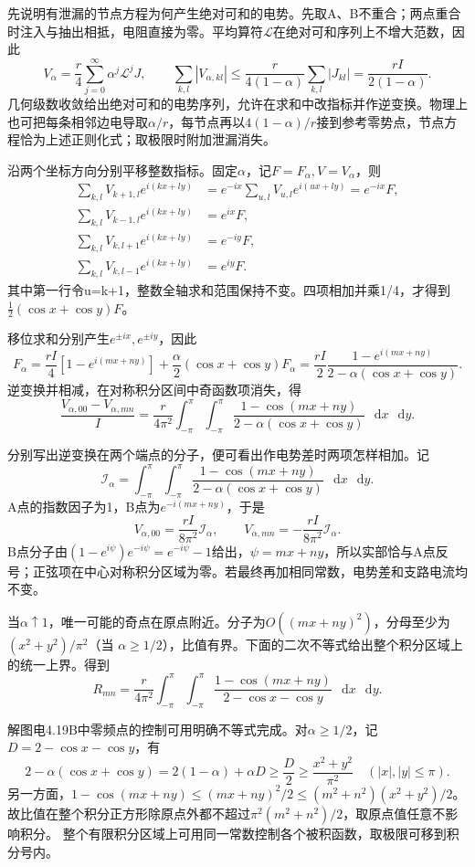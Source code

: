 \documentclass[UTF8,fontset=fandol,a4paper,11pt]{ctexart}
\newcommand{\dd}{\mathop{}\!\mathrm{d}}
\begin{document}
先说明有泄漏的节点方程为何产生绝对可和的电势。先取A、B不重合；两点重合时注入与抽出相抵，电阻直接为零。平均算符$\mathcal L$在绝对可和序列上不增大范数，因此
\[
V_\alpha=\frac r4\sum_{j=0}^{\infty}\alpha^j\mathcal L^jJ,\qquad
\sum_{k,l}|V_{\alpha,kl}|\le\frac{r}{4(1-\alpha)}\sum_{k,l}|J_{kl}|
=\frac{rI}{2(1-\alpha)}.
\]
几何级数收敛给出绝对可和的电势序列，允许在求和中改指标并作逆变换。物理上也可把每条相邻边电导取$\alpha/r$，每节点再以$4(1-\alpha)/r$接到参考零势点，节点方程恰为上述正则化式；取极限时附加泄漏消失。

沿两个坐标方向分别平移整数指标。固定$\alpha$，记$F=F_\alpha,V=V_\alpha$，则
\begin{align*}
\sum_{k,l}V_{k+1,l}e^{i(kx+ly)}&=e^{-ix}\sum_{u,l}V_{u,l}e^{i(ux+ly)}=e^{-ix}F,\\
\sum_{k,l}V_{k-1,l}e^{i(kx+ly)}&=e^{ix}F,\\
\sum_{k,l}V_{k,l+1}e^{i(kx+ly)}&=e^{-iy}F,\\
\sum_{k,l}V_{k,l-1}e^{i(kx+ly)}&=e^{iy}F.
\end{align*}
其中第一行令u=k+1，整数全轴求和范围保持不变。四项相加并乘1/4，才得到$\tfrac12(\cos x+\cos y)F$。

移位求和分别产生$e^{\pm ix},e^{\pm iy}$，因此
\[
F_\alpha=\frac{rI}{4}[1-e^{i(mx+ny)}]
+\frac\alpha2(\cos x+\cos y)F_\alpha
=\frac{rI}{2}\frac{1-e^{i(mx+ny)}}{2-\alpha(\cos x+\cos y)}.
\]
逆变换并相减，在对称积分区间中奇函数项消失，得
\[
\frac{V_{\alpha,00}-V_{\alpha,mn}}I
=\frac r{4\pi^2}\int_{-\pi}^{\pi}\!\!\int_{-\pi}^{\pi}
\frac{1-\cos(mx+ny)}{2-\alpha(\cos x+\cos y)}\,\dd x\,\dd y.
\]

分别写出逆变换在两个端点的分子，便可看出作电势差时两项怎样相加。记
\[
\mathcal I_\alpha=\int_{-\pi}^{\pi}\!\!\int_{-\pi}^{\pi}
\frac{1-\cos(mx+ny)}{2-\alpha(\cos x+\cos y)}\,\dd x\,\dd y.
\]
A点的指数因子为1，B点为$e^{-i(mx+ny)}$，于是
\[
V_{\alpha,00}=\frac{rI}{8\pi^2}\mathcal I_\alpha,\qquad
V_{\alpha,mn}=-\frac{rI}{8\pi^2}\mathcal I_\alpha.
\]
B点分子由$(1-e^{i\psi})e^{-i\psi}=e^{-i\psi}-1$给出，$\psi=mx+ny$，所以实部恰与A点反号；正弦项在中心对称积分区域为零。若最终再加相同常数，电势差和支路电流均不变。

当$\alpha\uparrow1$，唯一可能的奇点在原点附近。分子为$O((mx+ny)^2)$，分母至少为 $(x^2+y^2)/\pi^2$（当 $\alpha\ge1/2$），比值有界。下面的二次不等式给出整个积分区域上的统一上界。得到
\[
\boxed{R_{mn}=\frac r{4\pi^2}\int_{-\pi}^{\pi}\!\!\int_{-\pi}^{\pi}
\frac{1-\cos(mx+ny)}{2-\cos x-\cos y}\,\dd x\,\dd y.}
\]

解图电4.19B中零频点的控制可用明确不等式完成。对$\alpha\ge1/2$，记$D=2-\cos x-\cos y$，有
\[
2-\alpha(\cos x+\cos y)=2(1-\alpha)+\alpha D\ge\frac D2
\ge\frac{x^2+y^2}{\pi^2}\quad (|x|,|y|\le\pi).
\]
另一方面，$1-\cos(mx+ny)\le(mx+ny)^2/2\le(m^2+n^2)(x^2+y^2)/2$。故比值在整个积分正方形除原点外都不超过$\pi^2(m^2+n^2)/2$，取原点值任意不影响积分。
整个有限积分区域上可用同一常数控制各个被积函数，取极限可移到积分号内。
\end{document}
